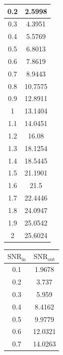 \documentclass[12pt, a4paper] {ncc}
\begin{document}
\begin{table}[H]
\begin{tabular} { |c|c| }
                        0.2   &  2.5998	\\ \hline
                        0.3   &  4.3951	\\ \hline
                        0.4   &  5.5769	\\ \hline
                        0.5   &  6.8013	\\ \hline
                        0.6   &  7.8619	\\ \hline
                        0.7   &  8.9443	\\ \hline
                        0.8   &  10.7575	\\ \hline
                        0.9   &  12.8911	\\ \hline
                        1     &  13.1404	\\ \hline
                        1.1   &  14.0451	\\ \hline
                        1.2   &  16.08	\\ \hline
                        1.3   &  18.1254	\\ \hline
                        1.4   &  18.5445	\\ \hline
                        1.5   &  21.1901	\\ \hline
                        1.6   &  21.5	\\ \hline
                        1.7   &  22.4446	\\ \hline
                        1.8   &  24.0947	\\ \hline
                        1.9   &  25.0542	\\ \hline
                        2     &  25.6024	\\ \hline
            \end{tabular}
            \begin{tabular} { |c|c| }
                \hline
					$\text{SNR}_\text{in}$ & $\text{SNR}_\text{out}$ \\ \hline
                        0.1  &   1.9678 \\ \hline
                        0.2  &   3.737 \\ \hline
                        0.3  &   5.959 \\ \hline
                        0.4  &   8.4162 \\ \hline
                        0.5  &   9.9779 \\ \hline
                        0.6  &   12.0321 \\ \hline
                        0.7  &   14.0263 \\ \hline

\end{tabular}
\end{table}
\end{document}
